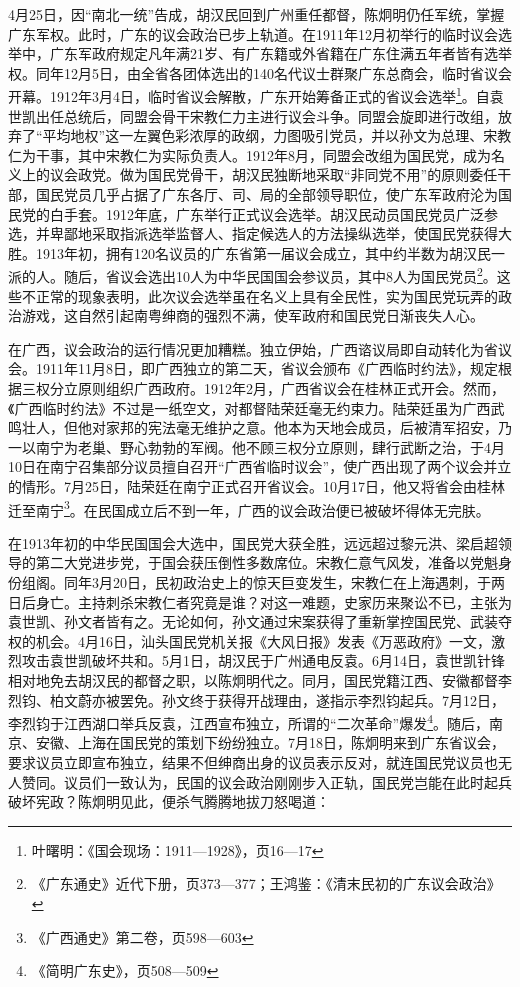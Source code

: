 4月25日，因“南北一统”告成，胡汉民回到广州重任都督，陈炯明仍任军统，掌握广东军权。此时，广东的议会政治已步上轨道。在1911年12月初举行的临时议会选举中，广东军政府规定凡年满21岁、有广东籍或外省籍在广东住满五年者皆有选举权。同年12月5日，由全省各团体选出的140名代议士群聚广东总商会，临时省议会开幕。1912年3月4日，临时省议会解散，广东开始筹备正式的省议会选举\footnote{叶曙明：《国会现场：1911—1928》，页16—17}。自袁世凯出任总统后，同盟会骨干宋教仁力主进行议会斗争。同盟会旋即进行改组，放弃了“平均地权”这一左翼色彩浓厚的政纲，力图吸引党员，并以孙文为总理、宋教仁为干事，其中宋教仁为实际负责人。1912年8月，同盟会改组为国民党，成为名义上的议会政党。做为国民党骨干，胡汉民独断地采取“非同党不用”的原则委任干部，国民党员几乎占据了广东各厅、司、局的全部领导职位，使广东军政府沦为国民党的白手套。1912年底，广东举行正式议会选举。胡汉民动员国民党员广泛参选，并卑鄙地采取指派选举监督人、指定候选人的方法操纵选举，使国民党获得大胜。1913年初，拥有120名议员的广东省第一届议会成立，其中约半数为胡汉民一派的人。随后，省议会选出10人为中华民国国会参议员，其中8人为国民党员\footnote{《广东通史》近代下册，页373—377；王鸿鉴：《清末民初的广东议会政治》}。这些不正常的现象表明，此次议会选举虽在名义上具有全民性，实为国民党玩弄的政治游戏，这自然引起南粤绅商的强烈不满，使军政府和国民党日渐丧失人心。

在广西，议会政治的运行情况更加糟糕。独立伊始，广西谘议局即自动转化为省议会。1911年11月8日，即广西独立的第二天，省议会颁布《广西临时约法》，规定根据三权分立原则组织广西政府。1912年2月，广西省议会在桂林正式开会。然而，《广西临时约法》不过是一纸空文，对都督陆荣廷毫无约束力。陆荣廷虽为广西武鸣壮人，但他对家邦的宪法毫无维护之意。他本为天地会成员，后被清军招安，乃一以南宁为老巢、野心勃勃的军阀。他不顾三权分立原则，肆行武断之治，于4月10日在南宁召集部分议员擅自召开“广西省临时议会”，使广西出现了两个议会并立的情形。7月25日，陆荣廷在南宁正式召开省议会。10月17日，他又将省会由桂林迁至南宁\footnote{《广西通史》第二卷，页598—603}。在民国成立后不到一年，广西的议会政治便已被破坏得体无完肤。

在1913年初的中华民国国会大选中，国民党大获全胜，远远超过黎元洪、梁启超领导的第二大党进步党，于国会获压倒性多数席位。宋教仁意气风发，准备以党魁身份组阁。同年3月20日，民初政治史上的惊天巨变发生，宋教仁在上海遇刺，于两日后身亡。主持刺杀宋教仁者究竟是谁？对这一难题，史家历来聚讼不已，主张为袁世凯、孙文者皆有之。无论如何，孙文通过宋案获得了重新掌控国民党、武装夺权的机会。4月16日，汕头国民党机关报《大风日报》发表《万恶政府》一文，激烈攻击袁世凯破坏共和。5月1日，胡汉民于广州通电反袁。6月14日，袁世凯针锋相对地免去胡汉民的都督之职，以陈炯明代之。同月，国民党籍江西、安徽都督李烈钧、柏文蔚亦被罢免。孙文终于获得开战理由，遂指示李烈钧起兵。7月12日，李烈钧于江西湖口举兵反袁，江西宣布独立，所谓的“二次革命”爆发\footnote{《简明广东史》，页508—509}。随后，南京、安徽、上海在国民党的策划下纷纷独立。7月18日，陈炯明来到广东省议会，要求议员立即宣布独立，结果不但绅商出身的议员表示反对，就连国民党议员也无人赞同。议员们一致认为，民国的议会政治刚刚步入正轨，国民党岂能在此时起兵破坏宪政？陈炯明见此，便杀气腾腾地拔刀怒喝道：

